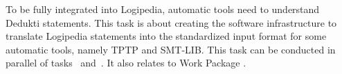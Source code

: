 \begin{workpackage}
\begin{tasklist}
\begin{task}[id=tracetodedukti,
      title=Translate ATP traces into Dedukti,
      lead=Imt,
      LieRM=12,
      ImtRM=8,
      SacRM=2,
    ]



  
\end{task}


  \begin{task}[id=deduktitoatp,
      title=Translate Dedukti statements into ATPs inputs,
      lead=Oca,
      LieRM=8,
      SacRM=3,
      BelRM=3,
      OcaRM=3
    ]

    To be fully integrated into Logipedia, automatic tools need to understand
    Dedukti statements.  This task is about creating the software infrastructure
    to translate Logipedia statements into the standardized input format for
    some automatic tools, namely TPTP and SMT-LIB.  This task can be conducted
    in parallel of tasks~
    and~.  It also relates to Work Package
    .


\end{task}
\end{tasklist}
\end{workpackage}
